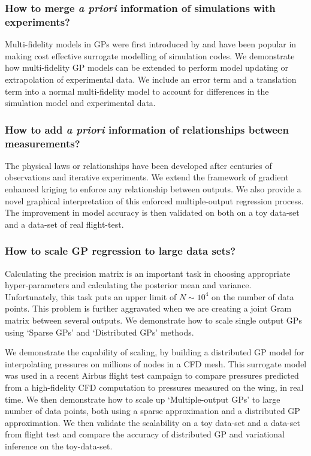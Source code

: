 \subsubsection*{How to merge \textit{a priori} information of simulations with experiments?}
Multi-fidelity models in GPs were first introduced by \cite{kennedy2000predicting} and have been popular in making cost effective surrogate modelling of simulation codes. We demonstrate how multi-fidelity GP models can be extended to perform model updating or extrapolation of experimental data. We include an error term and a translation term into a normal multi-fidelity model to account for differences in the simulation model and experimental data. 

\subsubsection*{How to add \textit{a priori} information of relationships between measurements?}
The physical laws or relationships have been developed after centuries of observations and iterative experiments. We extend the framework of gradient enhanced kriging to enforce any relationship between outputs. We also provide a novel graphical interpretation of this enforced multiple-output regression process. The improvement in model accuracy is then validated on both on a toy data-set and a data-set of real flight-test.

\subsubsection*{How to scale GP regression to large data sets?}
Calculating the precision matrix is an important task in choosing appropriate hyper-parameters and calculating the posterior mean and variance. Unfortunately, this task puts an upper limit of $N \sim 10^4$ on the number of data points. This problem is further aggravated when we are creating a joint Gram matrix between several outputs. We demonstrate how to scale single output GPs using `Sparse GPs'  and `Distributed GPs' methods.

We demonstrate the capability of scaling, by building a distributed GP model for interpolating pressures on millions of nodes in a CFD mesh. This surrogate model was used in a recent Airbus flight test campaign to compare pressures predicted from a high-fidelity CFD computation to pressures measured on the wing, in real time. We then demonstrate how to scale up `Multiple-output GPs' to large number of data points, both using a sparse approximation and a distributed GP approximation. We then validate the scalability on a toy data-set and a data-set from flight test and compare the accuracy of distributed GP and variational inference on the toy-data-set. 


